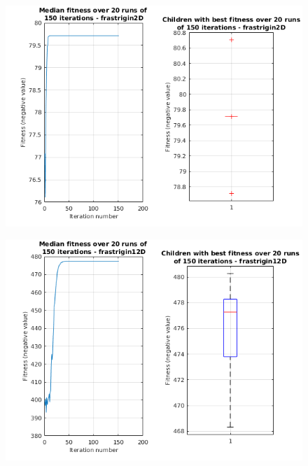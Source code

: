 \documentclass[paper=a4, fontsize=11pt]{scrartcl} %
\begin{document}
    \begin{figure}[H]
        \centering
        \begin{minipage}{\textwidth}
            \centering
            \includegraphics[width=.95\linewidth]{t3-funcMin-fitnessandbox-frastrigin2d}
            \label{fig:frastrigin2d}
        \end{minipage}%
    \end{figure}

    \begin{figure}[H]
        \centering
        \begin{minipage}{\textwidth}
            \centering
            \includegraphics[width=.95\linewidth]{t3-funcMin-fitnessandbox-frastrigin12d}
            \label{fig:frastrigin12d}
        \end{minipage}%
    \end{figure}
\end{document}
